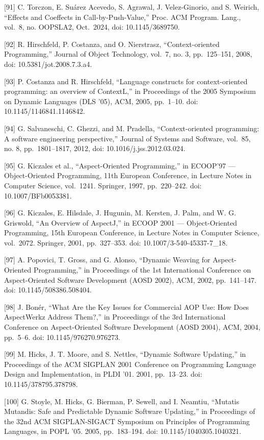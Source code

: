 {[}91{]} C. Torczon, E. Suárez Acevedo, S. Agrawal, J. Velez-Ginorio, and S. Weirich,
``Effects and Coeffects in Call-by-Push-Value,'' Proc. ACM Program. Lang., vol.~8,
no. OOPSLA2, Oct.~2024, doi: 10.1145/3689750.

{[}92{]} R. Hirschfeld, P. Costanza, and O. Nierstrasz, ``Context-oriented
Programming,'' Journal of Object Technology, vol.~7, no. 3, pp.~125--151, 2008, doi:
10.5381/jot.2008.7.3.a4.

{[}93{]} P. Costanza and R. Hirschfeld, ``Language constructs for context-oriented
programming: an overview of ContextL,'' in Proceedings of the 2005 Symposium on
Dynamic Languages (DLS '05), ACM, 2005, pp.~1--10. doi: 10.1145/1146841.1146842.

{[}94{]} G. Salvaneschi, C. Ghezzi, and M. Pradella, ``Context-oriented programming:
A software engineering perspective,'' Journal of Systems and Software, vol.~85,
no. 8, pp.~1801--1817, 2012, doi: 10.1016/j.jss.2012.03.024.

{[}95{]} G. Kiczales et al., ``Aspect-Oriented Programming,'' in ECOOP'97 ---
Object-Oriented Programming, 11th European Conference, in Lecture Notes in Computer
Science, vol.~1241. Springer, 1997, pp.~220--242. doi: 10.1007/BFb0053381.

{[}96{]} G. Kiczales, E. Hilsdale, J. Hugunin, M. Kersten, J. Palm, and W. G.
Griswold, ``An Overview of AspectJ,'' in ECOOP 2001 --- Object-Oriented
Programming, 15th European Conference, in Lecture Notes in Computer Science,
vol.~2072. Springer, 2001, pp.~327--353. doi: 10.1007/3-540-45337-7\_18.

{[}97{]} A. Popovici, T. Gross, and G. Alonso, ``Dynamic Weaving for Aspect-Oriented
Programming,'' in Proceedings of the 1st International Conference on Aspect-Oriented
Software Development (AOSD 2002), ACM, 2002, pp.~141--147. doi: 10.1145/508386.508404.

{[}98{]} J. Bonér, ``What Are the Key Issues for Commercial AOP Use: How Does
AspectWerkz Address Them?,'' in Proceedings of the 3rd International Conference on
Aspect-Oriented Software Development (AOSD 2004), ACM, 2004, pp.~5--6. doi:
10.1145/976270.976273.

{[}99{]} M. Hicks, J. T. Moore, and S. Nettles, ``Dynamic Software Updating,'' in
Proceedings of the ACM SIGPLAN 2001 Conference on Programming Language Design and
Implementation, in PLDI '01. 2001, pp.~13--23. doi: 10.1145/378795.378798.

{[}100{]} G. Stoyle, M. Hicks, G. Bierman, P. Sewell, and I. Neamtiu, ``Mutatis
Mutandis: Safe and Predictable Dynamic Software Updating,'' in Proceedings of the
32nd ACM SIGPLAN-SIGACT Symposium on Principles of Programming Languages, in POPL
'05. 2005, pp.~183--194. doi: 10.1145/1040305.1040321.

